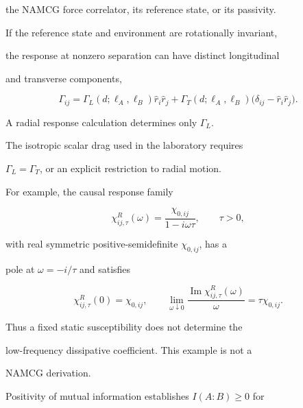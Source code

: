 the NAMCG force correlator, its reference state, or its passivity.



If the reference state and environment are rotationally invariant,

the response at nonzero separation can have distinct longitudinal

and transverse components,

\[

\Gamma_{ij}

=

\Gamma_L(d;\ell_A,\ell_B)\hat r_i\hat r_j

+\Gamma_T(d;\ell_A,\ell_B)

 \bigl(\delta_{ij}-\hat r_i\hat r_j\bigr).

\]

A radial response calculation determines only \(\Gamma_L\).

The isotropic scalar drag used in the laboratory requires

\(\Gamma_L=\Gamma_T\), or an explicit restriction to radial motion.



For example, the causal response family

\[

\chi^R_{ij,\tau}(\omega)

=

\frac{\chi_{0,ij}}{1-i\omega\tau},

\qquad \tau>0,

\]

with real symmetric positive-semidefinite \(\chi_{0,ij}\), has a

pole at \(\omega=-i/\tau\) and satisfies

\[

\chi^R_{ij,\tau}(0)=\chi_{0,ij},

\qquad

\lim_{\omega\downarrow0}

\frac{\operatorname{Im}\chi^R_{ij,\tau}(\omega)}{\omega}

=\tau\chi_{0,ij}.

\]

Thus a fixed static susceptibility does not determine the

low-frequency dissipative coefficient. This example is not a

NAMCG derivation.



Positivity of mutual information establishes \(I(A:B)\geq0\) for

